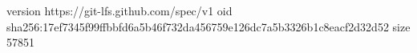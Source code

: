 version https://git-lfs.github.com/spec/v1
oid sha256:17ef7345f99ffbbfd6a5b46f732da456759e126dc7a5b3326b1c8eacf2d32d52
size 57851
